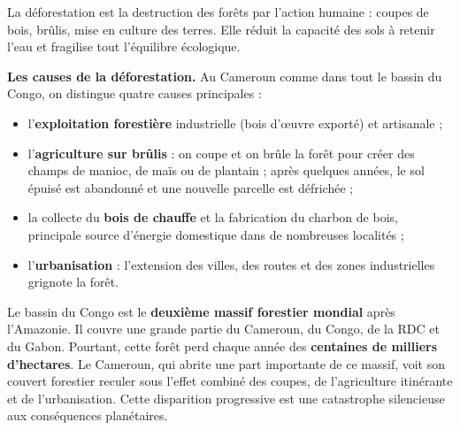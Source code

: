 \documentclass[11pt]{article}
\newcommand{\cle}[1]{{\popxbold\color{popdark}#1}}
\begin{document}
\begin{definition}[Déforestation]
La \cle{déforestation} est la destruction des forêts par l'action humaine : coupes de bois, brûlis, mise en culture des terres. Elle réduit la capacité des sols à retenir l'eau et fragilise tout l'équilibre écologique.
\end{definition}

\textbf{Les causes de la déforestation.} Au Cameroun comme dans tout le bassin du Congo, on distingue quatre causes principales :
\begin{itemize}
\item l'\textbf{exploitation forestière} industrielle (bois d'œuvre exporté) et artisanale ;
\item l'\textbf{agriculture sur brûlis} : on coupe et on brûle la forêt pour créer des champs de manioc, de maïs ou de plantain ; après quelques années, le sol épuisé est abandonné et une nouvelle parcelle est défrichée ;
\item la collecte du \textbf{bois de chauffe} et la fabrication du charbon de bois, principale source d'énergie domestique dans de nombreuses localités ;
\item l'\textbf{urbanisation} : l'extension des villes, des routes et des zones industrielles grignote la forêt.
\end{itemize}

\begin{exemplebox}
Le bassin du Congo est le \textbf{deuxième massif forestier mondial} après l'Amazonie. Il couvre une grande partie du Cameroun, du Congo, de la RDC et du Gabon. Pourtant, cette forêt perd chaque année des \textbf{centaines de milliers d'hectares}. Le Cameroun, qui abrite une part importante de ce massif, voit son couvert forestier reculer sous l'effet combiné des coupes, de l'agriculture itinérante et de l'urbanisation. Cette disparition progressive est une catastrophe silencieuse aux conséquences planétaires.
\end{exemplebox}
\end{document}
